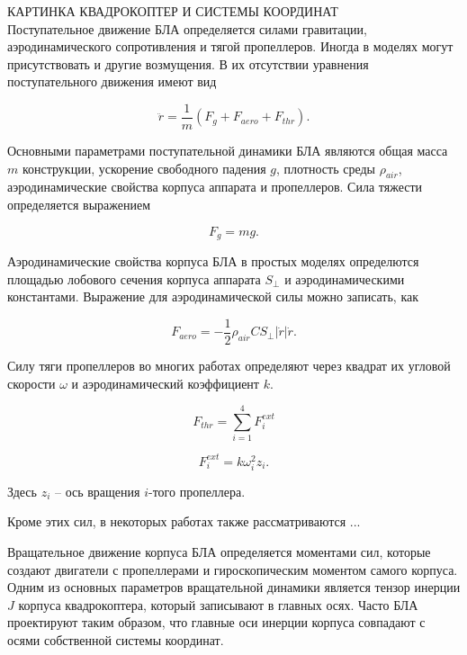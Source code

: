 \documentclass[a4paper,14pt,oneside,openany]{memoir}
\begin{document}
	КАРТИНКА КВАДРОКОПТЕР И СИСТЕМЫ КООРДИНАТ
	\\
	
	Поступательное движение БЛА определяется силами гравитации, аэродинамического сопротивления и тягой пропеллеров. Иногда в моделях могут присутствовать и другие возмущения. В их отсутствии уравнения поступательного движения имеют вид
	
	\begin{equation} \label{eq:common_traslational_motion}
	\ddot{r} = \frac{1}{m}(F_g + F_{aero} + F_{thr}).
	\end{equation}
	
	Основными параметрами поступательной динамики БЛА являются общая масса {$m$} конструкции, ускорение свободного падения \textbf{{$g$}}, плотность среды {$\rho_{air}$}, аэродинамические свойства корпуса аппарата и пропеллеров. Сила тяжести определяется выражением
	
	\begin{equation} \label{eq:gravity_force}
	F_g = mg.
	\end{equation}
	
	Аэродинамические свойства корпуса БЛА в простых моделях определются площадью лобового сечения корпуса аппарата {$S_{\perp}$} и аэродинамическими константами. Выражение для аэродинамической силы можно записать, как
	 
	\begin{equation} \label{eq:aerodynamic_force}
	F_{aero} = - \frac{1}{2} \rho_{air} C S_{\perp} |\dot{r}| \dot{r}.
	\end{equation}
	
	Силу тяги пропеллеров во многих работах определяют через квадрат их угловой скорости $\omega$ и аэродинамический коэффициент $k$.
	
	\begin{equation} \label{eq:thrust_force}
	F_{thr} = \sum_{i=1}^{4}{ {F_{i}^{ext} }}
	\end{equation}
	
	\begin{equation} \label{eq:rotor_ext_force}
	F_{i}^{ext} = k \omega^2_i z_i.
	\end{equation}
	
	Здесь $z_i$ -- ось вращения $i$-того пропеллера.
	
    Кроме этих сил, в некоторых работах также рассматриваются ...
    
    Вращательное движение корпуса БЛА определяется моментами сил, которые создают двигатели с пропеллерами и гироскопическим моментом самого корпуса. Одним из основных параметров вращательной динамики является тензор инерции $J$ корпуса квадрокоптера, который записывают в главных осях. Часто БЛА проектируют таким образом, что главные оси инерции корпуса совпадают с осями собственной системы координат.
    
\end{document}
